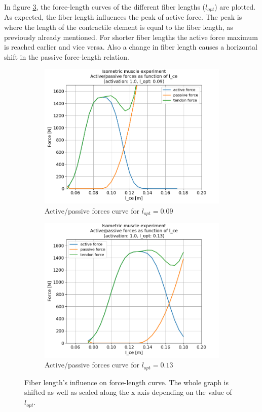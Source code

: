 \documentclass{cmc}
\begin{document}
In figure \ref{fig:1c}, the force-length curves of the different fiber lengths ($l_{opt}$) are plotted. As expected, the fiber length influences the peak of active force. The peak is where the length of the contractile element is equal to the fiber length, as previously already mentioned. For shorter fiber lengths the active force maximum is reached earlier and vice versa. Also a change in fiber length causes a horizontal shift in the passive force-length relation.

\begin{figure}[ht]
  \begin{subfigure}[b]{0.48\textwidth}
    \includegraphics[width=\textwidth]{figures/passive_forces_as_function_of_l_ce_l_opt_09.png}
    \caption{Active/passive forces curve for $l_{opt} = 0.09$}
    \label{fig:}
  \end{subfigure}
  \begin{subfigure}[b]{0.48\textwidth}
    \includegraphics[width=\textwidth]{figures/passive_forces_as_function_of_l_ce_l_opt_13.png}
    \caption{Active/passive forces curve for $l_{opt} = 0.13$}
    \label{fig:}
  \end{subfigure}
  \caption{Fiber length's influence on force-length curve. The whole graph is shifted as well as scaled along the x axis depending on the value of $l_{opt}$.}
  \label{fig:1c}
\end{figure}
\end{document}
